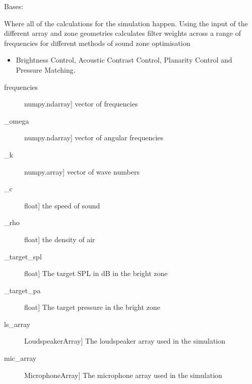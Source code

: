 \documentclass[letterpaper,10pt,english]{sphinxmanual}
\begin{document}

\begin{fulllineitems}
\label{\detokenize{source/pyzones:pyzones.Simulation}}
Bases: 

Where all of the calculations for the simulation happen. Using the input of the different array and zone
geometries calculates filter weights across a range of frequencies for different methods of sound zone optimisation
\begin{itemize}
\item {} 
Brightness Control, Acoustic Contrast Control, Planarity Control and Pressure Matching.

\end{itemize}
\begin{description}
\item[{frequencies}] \leavevmode{[}numpy.ndarray{]}
vector of frequencies

\item[{\_omega}] \leavevmode{[}numpy.ndarray{]}
vector of angular frequencies

\item[{\_k}] \leavevmode{[}numpy.array{]}
vector of wave numbers

\item[{\_c}] \leavevmode{[}float{]}
the speed of sound

\item[{\_rho}] \leavevmode{[}float{]}
the density of air

\item[{\_target\_spl}] \leavevmode{[}float{]}
The target SPL in dB in the bright zone

\item[{\_target\_pa}] \leavevmode{[}float{]}
The target pressure in the bright zone

\item[{ls\_array}] \leavevmode{[}LoudspeakerArray{]}
The loudspeaker array used in the simulation

\item[{mic\_array}] \leavevmode{[}MicrophoneArray{]}
The microphone array used in the simulation


\end{description}
\end{fulllineitems}
\end{document}
